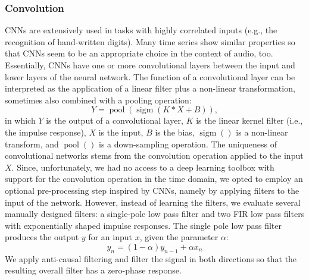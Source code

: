 \documentclass{article}
\DeclareMathOperator*{\pool}{pool}
\DeclareMathOperator*{\sigm}{sigm}
\begin{document}
\subsubsection{Convolution}
CNNs are extensively used in tasks with highly correlated inputs (e.g., the recognition of hand-written digits). Many time series show similar properties so that CNNs seem to be an appropriate choice in the context of audio, too. Essentially, CNNs have one or more convolutional layers between the input and lower layers of the neural network. The function of a convolutional layer can be interpreted as the application of a linear filter plus a non-linear transformation, sometimes also combined with a pooling operation:
\begin{equation}\label{Covulution}
Y = \pool(\sigm(K \ast X + B)),  
\end{equation}
in which $Y$ is the output of a convolutional layer, $K$ is the linear kernel filter (i.e., the impulse response), $X$ is the input, $B$ is the bias, $\sigm()$ is a non-linear transform, and $\pool()$ is a down-sampling operation. The uniqueness of convolutional networks stems from the convolution operation applied to the input $X$. Since, unfortunately, we had no access to a deep learning toolbox with support for the convolution operation in the time domain, we opted to employ an optional pre-processing step inspired by CNNs, namely by applying filters to the input of the network. However, instead of learning the filters, we evaluate several manually designed filters: a single-pole low pass filter and two FIR low pass filters with exponentially shaped impulse responses.
The single pole low pass filter produces the output $y$ for an input $x$, given the parameter $\alpha$:
\begin{equation}\label{IIR}
y_{n} = (1-\alpha) y_{n-1} + \alpha x_{n}
\end{equation}
We apply anti-causal filtering and filter the signal in both directions so that the resulting overall filter has a zero-phase response.
\end{document}
